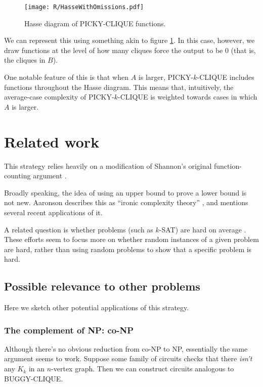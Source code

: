 \documentclass[12pt]{article}
\theoremstyle{definition}
\begin{document}
\begin{figure}
\centering
\texttt{[image: R/HasseWithOmissions.pdf]}
\caption{Hasse diagram of PICKY-CLIQUE functions.}
\label{fig:Hasse}
\end{figure}


We can represent this using something akin
to figure \ref{fig:Hasse}. In this case, however, we
draw functions at the level of how many
cliques force the output to be 0 (that is,
the cliques in $B$).

One notable feature of this is that when $A$ is
larger, PICKY-$k$-CLIQUE includes functions
throughout the Hasse diagram. This means that,
intuitively, the average-case complexity of
PICKY-$k$-CLIQUE is weighted towards cases
in which $A$ is larger.




\section{Related work}

This strategy relies heavily on a modification of Shannon's original
function-counting argument \cite{shannon_synthesis_1949}.

Broadly speaking, the idea of using an upper bound to prove a lower bound
is not new. Aaronson describes this as ``ironic complexity theory''
\cite{aaronson_pnp}, and mentions several recent applications of it.

A related question is whether problems
(such as $k$-SAT) are
hard on average \cite{bogdanov2006average}.
These efforts seem to focus more on whether
random
instances of a given problem are hard, rather
than using random problems to show that
a specific problem is hard.

\subsection{Possible relevance to other problems}

Here we sketch other potential applications of this strategy.

\subsubsection{The complement of NP: co-NP}

Although there's no obvious reduction from co-NP to NP, essentially
the same argument seems to work. Suppose some family of circuits
checks that there {\em isn't} any $K_k$ in an $n$-vertex graph.
Then we can construct circuits analogous to BUGGY-CLIQUE.
\end{document}
